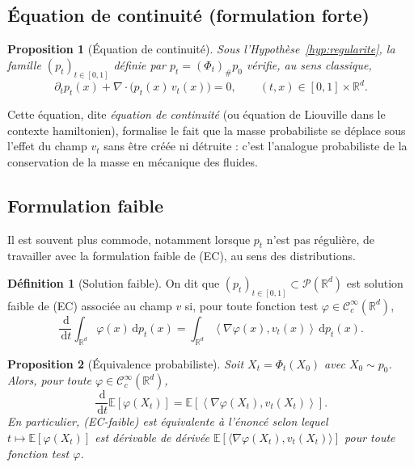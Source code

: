 \documentclass[11pt,a4paper]{article}
\theoremstyle{definition}
\newtheorem{definition}{Définition}[section]
\theoremstyle{plain}
\newtheorem{proposition}{Proposition}[section]
\theoremstyle{remark}
\newcommand{\R}{\mathbb{R}}
\newcommand{\E}{\mathbb{E}}
\newcommand{\dd}{\,\mathrm{d}}
\begin{document}
\subsection{Équation de continuité (formulation forte)}

\begin{proposition}[Équation de continuité]\label{prop:continuite-forte}
Sous l'Hypothèse~\ref{hyp:regularite}, la famille $(p_t)_{t\in[0,1]}$ définie par
$p_t=(\Phi_t)_\#p_0$ vérifie, au sens classique,
\[
  \boxed{
  \partial_t p_t(x) + \nabla\cdot\bigl(p_t(x)\,v_t(x)\bigr)=0,
  \qquad (t,x)\in[0,1]\times\R^d.
  }
  \tag{EC}
\]
\end{proposition}

Cette équation, dite \emph{équation de continuité} (ou équation de Liouville dans
le contexte hamiltonien), formalise le fait que la masse probabiliste se déplace
sous l'effet du champ $v_t$ sans être créée ni détruite : c'est l'analogue
probabiliste de la conservation de la masse en mécanique des fluides.

\subsection{Formulation faible}

Il est souvent plus commode, notamment lorsque $p_t$ n'est pas régulière, de
travailler avec la formulation faible de (EC), au sens des distributions.

\begin{definition}[Solution faible]
On dit que $(p_t)_{t\in[0,1]}\subset\mathcal{P}(\R^d)$ est solution faible de
(EC) associée au champ $v$ si, pour toute fonction test
$\varphi\in\mathcal{C}_c^\infty(\R^d)$,
\[
  \frac{\dd}{\dd t}\int_{\R^d}\varphi(x)\dd p_t(x)
  =
  \int_{\R^d}\left\langle \nabla\varphi(x),v_t(x)\right\rangle \dd p_t(x).
  \tag{EC-faible}
\]
\end{definition}

\begin{proposition}[Équivalence probabiliste]\label{prop:equiv-faible}
Soit $X_t=\Phi_t(X_0)$ avec $X_0\sim p_0$. Alors, pour toute
$\varphi\in\mathcal{C}_c^\infty(\R^d)$,
\[
  \frac{\dd}{\dd t}\E[\varphi(X_t)]
  =
  \E\left[\left\langle \nabla\varphi(X_t),v_t(X_t)\right\rangle\right].
\]
En particulier, (EC-faible) est équivalente à l'énoncé selon lequel $t\mapsto
\E[\varphi(X_t)]$ est dérivable de dérivée $\E[\langle\nabla\varphi(X_t),v_t(X_t)\rangle]$
pour toute fonction test $\varphi$.
\end{proposition}
\end{document}
